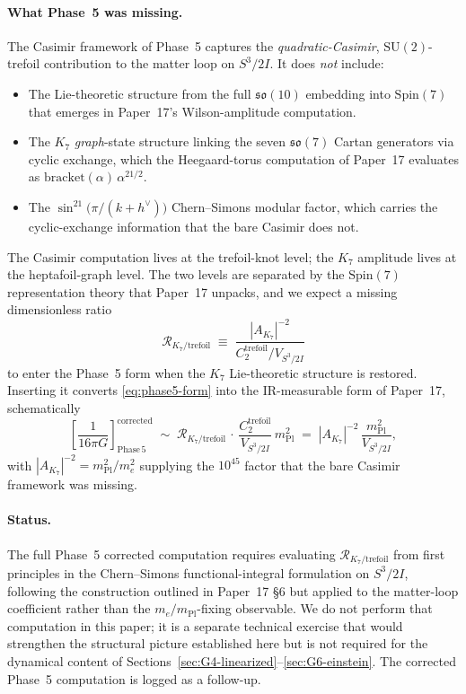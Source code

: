 \documentclass[11pt]{article}
\newcommand{\so}{\mathfrak{so}}
\newcommand{\mPl}{m_{\mathrm{Pl}}}
\newcommand{\me}{m_e}
\newcommand{\hv}{h^{\vee}}
\newcommand{\SU}{\mathrm{SU}}
\begin{document}
\paragraph{What Phase~5 was missing.}
The Casimir framework of Phase~5 captures the
\emph{quadratic-Casimir}, $\SU(2)$-trefoil contribution to the
matter loop on $S^3/2I$.  It does \emph{not} include:
\begin{itemize}
\item The Lie-theoretic structure from the full $\so(10)$
      embedding into $\mathrm{Spin}(7)$ that emerges in
      Paper~17's Wilson-amplitude computation.
\item The $K_7$ \emph{graph}-state structure linking the seven
      $\so(7)$ Cartan generators via cyclic exchange, which the
      Heegaard-torus computation of Paper~17 evaluates as
      $\mathrm{bracket}(\alpha)\,\alpha^{21/2}$.
\item The $\sin^{21}\!\bigl(\pi/(k+\hv)\bigr)$ Chern--Simons
      modular factor, which carries the cyclic-exchange
      information that the bare Casimir does not.
\end{itemize}
The Casimir computation lives at the trefoil-knot level; the
$K_7$ amplitude lives at the heptafoil-graph level.  The two
levels are separated by the $\mathrm{Spin}(7)$ representation theory
that Paper~17 unpacks, and we expect a missing dimensionless ratio
\begin{equation}
  \mathcal{R}_{K_7/\mathrm{trefoil}}
   \;\equiv\;
   \frac{|A_{K_7}|^{-2}}{C_2^{\mathrm{trefoil}}/V_{S^3/2I}}
  \label{eq:K7-trefoil-ratio}
\end{equation}
to enter the Phase~5 form when the $K_7$ Lie-theoretic structure is
restored.  Inserting it converts \eqref{eq:phase5-form} into the
IR-measurable form of Paper~17, schematically
\begin{equation}
  \left[\frac{1}{16\pi G}\right]_{\mathrm{Phase\,5}}^{\!\!\!\mathrm{corrected}}
   \;\sim\;
   \mathcal{R}_{K_7/\mathrm{trefoil}}\,\cdot\,
   \frac{C_2^{\mathrm{trefoil}}}{V_{S^3/2I}}\,\mPl^2
   \;=\;
   |A_{K_7}|^{-2}\,\frac{\mPl^2}{V_{S^3/2I}},
  \label{eq:phase5-corrected}
\end{equation}
with $|A_{K_7}|^{-2} = \mPl^2/\me^2$ supplying the $10^{45}$ factor
that the bare Casimir framework was missing.

\paragraph{Status.}
The full Phase~5 corrected computation requires evaluating
$\mathcal{R}_{K_7/\mathrm{trefoil}}$ from first principles in the
Chern--Simons functional-integral formulation on $S^3/2I$,
following the construction outlined in Paper~17 \S6 but applied
to the matter-loop coefficient rather than the
$\me/\mPl$-fixing observable.  We do not perform that computation
in this paper; it is a separate technical exercise that would
strengthen the structural picture established here but is not
required for the dynamical content of
Sections~\ref{sec:G4-linearized}--\ref{sec:G6-einstein}.  The
corrected Phase~5 computation is logged as a follow-up.
\end{document}
